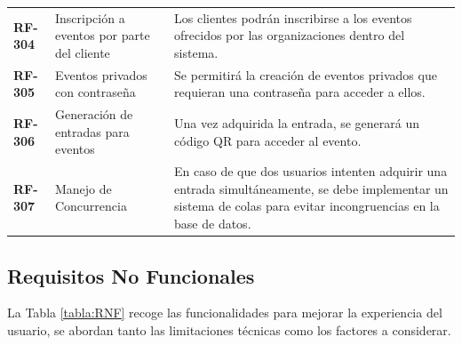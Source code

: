 \begin{longtable}{ p{2.5cm} p{4cm} p{9cm}  }
    \textbf{RF-304} & Inscripción a eventos por parte del cliente & Los clientes podrán inscribirse a los eventos ofrecidos por las organizaciones dentro del sistema.\\
    \textbf{RF-305} & Eventos privados con contraseña & Se permitirá la creación de eventos privados que requieran una contraseña para acceder a ellos.\\
    \textbf{RF-306} & Generación de entradas para eventos & Una vez adquirida la entrada, se generará un código QR para acceder al evento.\\
    \textbf{RF-307} & Manejo de Concurrencia & En caso de que dos usuarios intenten adquirir una entrada simultáneamente, se debe implementar 
    un sistema de colas para evitar incongruencias en la base de datos. \\
    \end{longtable}
    \newpage
    \subsection{Requisitos No Funcionales}
    La Tabla \ref{tabla:RNF} recoge las funcionalidades para mejorar la experiencia del usuario, se abordan tanto las limitaciones 
    técnicas como los factores a considerar.

